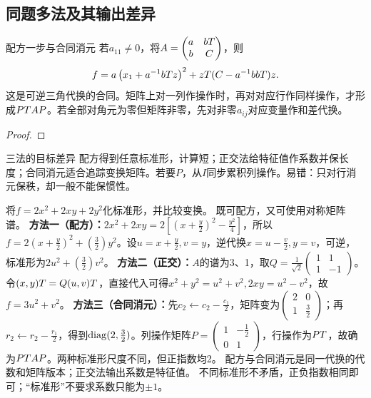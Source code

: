 \subsection{同题多法及其输出差异}
\begin{theorem}{配方一步与合同消元}
若$a_{11}\ne0$，将$A=\begin{pmatrix}a&bT\\b&C\end{pmatrix}$，则
\begin{equation}f=a\left(x_1+a^{-1}bTz\right)^2+zT(C-a^{-1}bbT)z.\label{eq:complete}\end{equation}
这是可逆三角代换的合同。矩阵上对一列作操作时，再对对应行作同样操作，才形成$PT AP$。若全部对角元为零但矩阵非零，先对非零$a_{ij}$对应变量作和差代换。
\end{theorem}
\begin{proof}

\end{proof}
\begin{method}{三法的目标差异}
配方得到任意标准形，计算短；正交法给特征值作系数并保长度；合同消元适合追踪变换矩阵。若要$P$，从$I$同步累积列操作。易错：只对行消元保秩，却一般不能保惯性。
\end{method}
{将$f=2x^2+2xy+2y^2$化标准形，并比较变换。}
{既可配方，又可使用对称矩阵谱。}
{\textbf{方法一（配方）：}$2x^2+2xy=2[(x+\frac{y}{2})^2-\frac{y^2}{4}]$，所以$f=2(x+\frac{y}{2})^2+(\frac{3}{2})y^2$。设$u=x+\frac{y}{2},v=y$，逆代换$x=u-\frac{v}{2},y=v$，可逆，标准形为$2u^2+(\frac{3}{2})v^2$。
\textbf{方法二（正交）：}$A$的谱为3、1，取$Q=\frac1{\sqrt2}\begin{pmatrix}1&1\\1&-1\end{pmatrix}$。令$(x,y)T=Q(u,v)T$，直接代入可得$x^2+y^2=u^2+v^2,2xy=u^2-v^2$，故$f=3u^2+v^2$。
\textbf{方法三（合同消元）：}先$c_2\leftarrow c_2-\frac{c_1}{2}$，矩阵变为$\begin{pmatrix}2&0\\1&\frac{3}{2}\end{pmatrix}$；再$r_2\leftarrow r_2-\frac{r_1}{2}$，得到$\operatorname{diag}(2,\frac{3}{2})$。列操作矩阵$P=\begin{pmatrix}1&-\frac{1}{2}\\0&1\end{pmatrix}$，行操作为$PT$，故确为$PT AP$。两种标准形尺度不同，但正指数均2。}
{配方与合同消元是同一代换的代数和矩阵版本；正交法输出系数是特征值。}
{不同标准形不矛盾，正负指数相同即可；“标准形”不要求系数只能为$\pm1$。}
